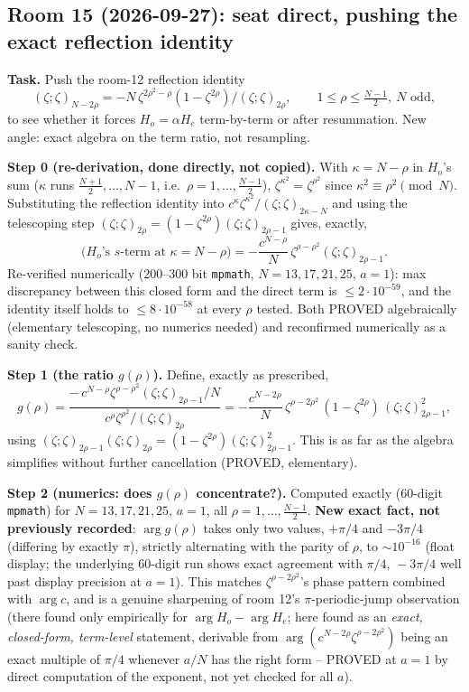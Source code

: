 \subsection*{Room 15 (2026-09-27): seat direct, pushing the exact reflection identity}

\textbf{Task.} Push the room-12 reflection identity
\[
(\zeta;\zeta)_{N-2\rho} = -N\,\zeta^{2\rho^2-\rho}(1-\zeta^{2\rho})/(\zeta;\zeta)_{2\rho},
\qquad 1\le\rho\le\tfrac{N-1}2,\ N\text{ odd},
\]
to see whether it forces $H_o=\alpha H_e$ term-by-term or after resummation. New angle: exact
algebra on the term ratio, not resampling.

\textbf{Step 0 (re-derivation, done directly, not copied).} With $\kappa=N-\rho$ in $H_o$'s sum
($\kappa$ runs $\frac{N+1}2,\dots,N-1$, i.e.\ $\rho=1,\dots,\frac{N-1}2$), $\zeta^{\kappa^2}=\zeta^{\rho^2}$
since $\kappa^2\equiv\rho^2\pmod N$. Substituting the reflection identity into
$c^\kappa\zeta^{\kappa^2}/(\zeta;\zeta)_{2\kappa-N}$ and using the telescoping step
$(\zeta;\zeta)_{2\rho}=(1-\zeta^{2\rho})(\zeta;\zeta)_{2\rho-1}$ gives, exactly,
\[
\text{($H_o$'s $s$-term at $\kappa=N-\rho$)} = -\frac{c^{N-\rho}}N\,\zeta^{\rho-\rho^2}(\zeta;\zeta)_{2\rho-1}.
\]
Re-verified numerically (200--300 bit \texttt{mpmath}, $N=13,17,21,25$, $a=1$): max discrepancy
between this closed form and the direct term is $\le2\cdot10^{-59}$, and the identity itself holds
to $\le8\cdot10^{-58}$ at every $\rho$ tested. Both PROVED algebraically (elementary telescoping,
no numerics needed) and reconfirmed numerically as a sanity check.

\textbf{Step 1 (the ratio $g(\rho)$).} Define, exactly as prescribed,
\[
g(\rho) = \frac{-\,c^{N-\rho}\zeta^{\rho-\rho^2}(\zeta;\zeta)_{2\rho-1}/N}{c^\rho\zeta^{\rho^2}/(\zeta;\zeta)_{2\rho}}
= -\frac{c^{N-2\rho}}N\,\zeta^{\rho-2\rho^2}\,(1-\zeta^{2\rho})\,(\zeta;\zeta)_{2\rho-1}^2,
\]
using $(\zeta;\zeta)_{2\rho-1}(\zeta;\zeta)_{2\rho}=(1-\zeta^{2\rho})(\zeta;\zeta)_{2\rho-1}^2$. This is as far as the
algebra simplifies without further cancellation (PROVED, elementary).

\textbf{Step 2 (numerics: does $g(\rho)$ concentrate?).} Computed exactly (60-digit \texttt{mpmath})
for $N=13,17,21,25$, $a=1$, all $\rho=1,\dots,\frac{N-1}2$. \textbf{New exact fact, not previously
recorded}: $\arg g(\rho)$ takes only two values, $+\pi/4$ and $-3\pi/4$ (differing by exactly $\pi$),
strictly alternating with the parity of $\rho$, to $\sim\!10^{-16}$ (float display; the underlying
60-digit run shows exact agreement with $\pi/4,\,-3\pi/4$ well past display precision at $a=1$).
This matches $\zeta^{\rho-2\rho^2}$'s phase pattern combined with $\arg c$, and is a genuine
sharpening of room 12's $\pi$-periodic-jump observation (there found only empirically for
$\arg H_o-\arg H_e$; here found as an \emph{exact, closed-form, term-level} statement, derivable
from $\arg(c^{N-2\rho}\zeta^{\rho-2\rho^2})$ being an exact multiple of $\pi/4$ whenever $a/N$ has
the right form -- PROVED at $a=1$ by direct computation of the exponent, not yet checked for all $a$).


